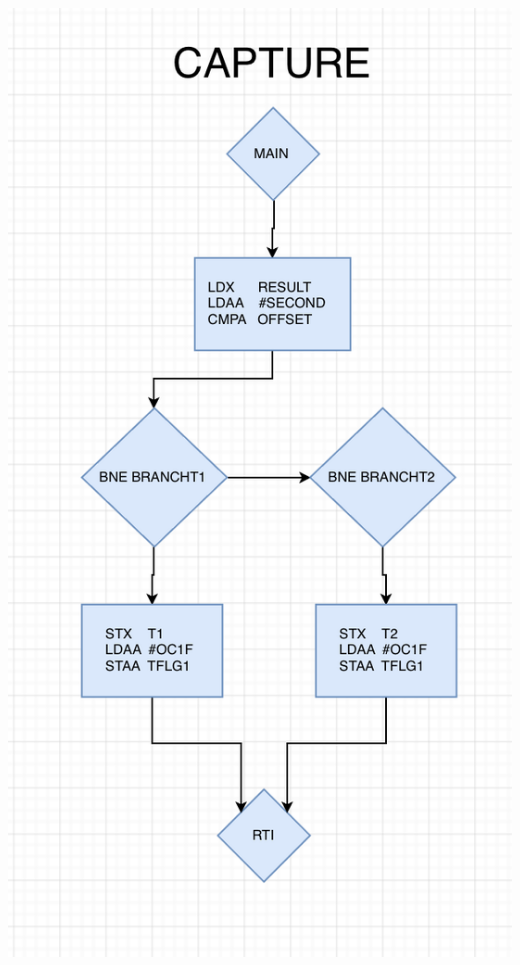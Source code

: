 \documentclass[12pt]{report}
\begin{document}
\begin{center}
     \includegraphics[scale=0.66]{cap.PNG}
     \newpage{}

\end{center}
\end{document}
